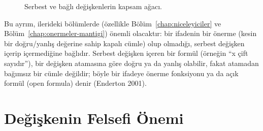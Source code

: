 \begin{figure}[htbp]
\centering
{}
\caption{Serbest ve bağlı değişkenlerin kapsam ağacı.}
\end{figure}

Bu ayrım, ilerideki bölümlerde (özellikle Bölüm~\ref{chap:niceleyiciler} ve Bölüm~\ref{chap:onermeler-mantigi}) önemli olacaktır: bir ifadenin bir önerme (kesin bir doğru/yanlış değerine sahip kapalı cümle) olup olmadığı, serbest değişken içerip içermediğine bağlıdır. Serbest değişken içeren bir formül (örneğin “x çift sayıdır”), bir değişken atamasına göre doğru ya da yanlış olabilir, fakat atamadan bağımsız bir cümle değildir; böyle bir ifadeye önerme fonksiyonu ya da açık formül (open formula) denir (Enderton 2001).

\section{Değişkenin Felsefi Önemi}

